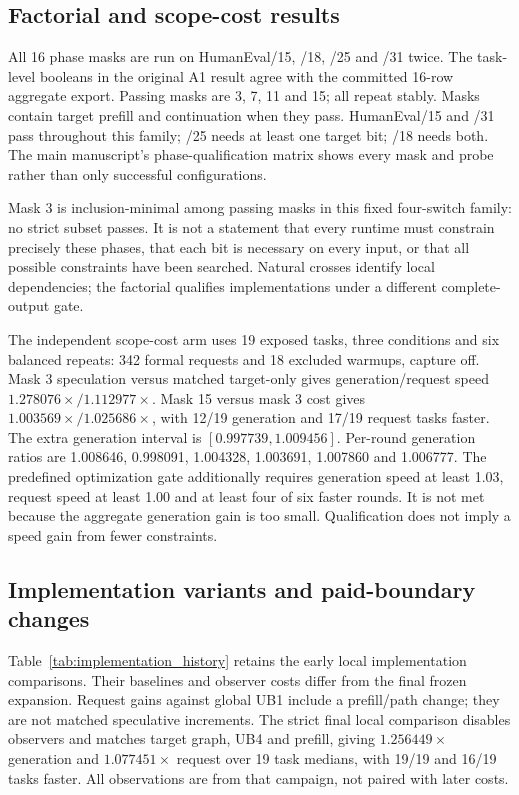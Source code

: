 \subsection{Factorial and scope-cost results}
\label{supp:phase_factorial}
All 16 phase masks are run on HumanEval/15, /18, /25 and /31 twice. The task-level booleans in the original A1 result agree with the committed 16-row aggregate export. Passing masks are 3, 7, 11 and 15; all repeat stably. Masks contain target prefill and continuation when they pass. HumanEval/15 and /31 pass throughout this family; /25 needs at least one target bit; /18 needs both. The main manuscript's phase-qualification matrix shows every mask and probe rather than only successful configurations.

Mask 3 is inclusion-minimal among passing masks in this fixed four-switch family: no strict subset passes. It is not a statement that every runtime must constrain precisely these phases, that each bit is necessary on every input, or that all possible constraints have been searched. Natural crosses identify local dependencies; the factorial qualifies implementations under a different complete-output gate.

The independent scope-cost arm uses 19 exposed tasks, three conditions and six balanced repeats: 342 formal requests and 18 excluded warmups, capture off. Mask 3 speculation versus matched target-only gives generation/request speed $1.278076\times/1.112977\times$. Mask 15 versus mask 3 cost gives $1.003569\times/1.025686\times$, with 12/19 generation and 17/19 request tasks faster. The extra generation interval is $[0.997739,1.009456]$. Per-round generation ratios are 1.008646, 0.998091, 1.004328, 1.003691, 1.007860 and 1.006777. The predefined optimization gate additionally requires generation speed at least 1.03, request speed at least 1.00 and at least four of six faster rounds. It is not met because the aggregate generation gain is too small. Qualification does not imply a speed gain from fewer constraints.

\subsection{Implementation variants and paid-boundary changes}
\label{supp:implementation_variants}
Table~\ref{tab:implementation_history} retains the early local implementation comparisons. Their baselines and observer costs differ from the final frozen expansion. Request gains against global UB1 include a prefill/path change; they are not matched speculative increments. The strict final local comparison disables observers and matches target graph, UB4 and prefill, giving $1.256449\times$ generation and $1.077451\times$ request over 19 task medians, with 19/19 and 16/19 tasks faster. All observations are from that campaign, not paired with later costs.


